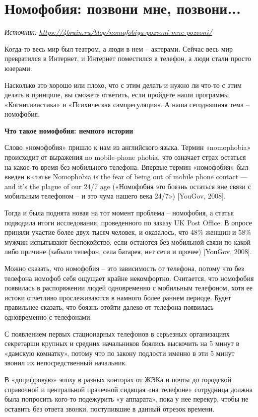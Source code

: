 \newpage
\section{Номофобия: позвони мне, позвони...}

\textit{Источник: \url{https://4brain.ru/blog/nomofobiya-pozvoni-mne-pozvoni/}}

Когда-то весь мир был театром, а люди в нем – актерами. Сейчас весь мир превратился в Интернет, и Интернет поместился в телефон, а люди стали просто юзерами.

Насколько это хорошо или плохо, что с этим делать и нужно ли что-то с этим делать в принципе, вы сможете ответить, если пройдете наши программы «Когнитивистика» и «Психическая саморегуляция». А наша сегодняшняя тема – номофобия.

\textbf{Что такое номофобия: немного истории}

Слово «номофобия» пришло к нам из английского языка. Термин «nomophobia» происходит от выражения no mobile-phone phobia, что означает страх остаться на какое-то время без мобильного телефона. Впервые термин «номофобия» был введен в статье Nomophobia is the fear of being out of mobile phone contact  ---  and it’s the plague of our 24/7 age («Номофобия это боязнь остаться вне связи с мобильным телефоном – и это чума нашего века 24/7») [YouGov, 2008].

Тогда и была поднята новая на тот момент проблема – номофобия, а статья подводила итоги исследования, проведенного по заказу UK Post Office. В опросе приняли участие более двух тысяч человек, и оказалось, что 48\% женщин и 58\% мужчин испытывают беспокойство, если остаются без мобильной связи по какой-либо причине (забыли телефон, села батарея, нет сети и прочее) [YouGov, 2008].

Можно сказать, что номофобия – это зависимость от телефона, потому что без телефона номофоб себя ощущает крайне некомфортно. Считается, что номофобия появилась в распоряжении людей одновременно с мобильным телефоном, хотя ее истоки отчетливо прослеживаются в намного более раннем периоде. Будет правильнее сказать, что боязнь отойти далеко от телефона появилась одновременно с телефонами.

С появлением первых стационарных телефонов в серьезных организациях секретарши крупных и средних начальников боялись выскочить на 5 минут в «дамскую комнатку», потому что по закону подлости именно в эти 5 минут звонил их непосредственный начальник.

В «доцифровую» эпоху в разных конторах от ЖЭКа и почты до городской справочной и центральной прачечной сидящая «на телефоне» сотрудница должна была попросить кого-то подежурить «у аппарата», пока у нее перекур, чтобы не оставить без ответа звонки, поступившие в данный отрезок времени.

